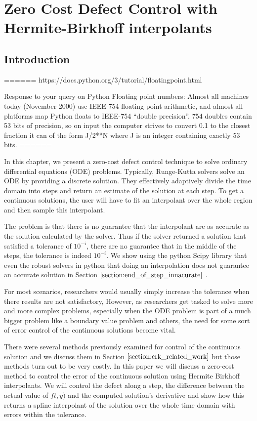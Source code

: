 \documentclass{article}
\begin{document}
\section{Zero Cost Defect Control with Hermite-Birkhoff interpolants}
\subsection{Introduction}

======
https://docs.python.org/3/tutorial/floatingpoint.html

Response to your query on Python Floating point numbers:
Almost all machines today (November 2000) use IEEE-754 floating point arithmetic, and almost all platforms map Python floats to IEEE-754 “double precision”. 754 doubles contain 53 bits of precision, so on input the computer strives to convert 0.1 to the closest fraction it can of the form J/2**N where J is an integer containing exactly 53 bits. 
======

In this chapter, we present a zero-cost defect control technique to solve ordinary differential equations (ODE) problems. Typically, Runge-Kutta solvers solve an ODE by providing a discrete solution. They effectively adaptively divide the time domain into steps and return an estimate of the solution at each step. To get a continuous solutions, the user will have to fit an interpolant over the whole region and then sample this interpolant. 

The problem is that there is no guarantee that the interpolant are as accurate as the solution calculated by the solver. Thus if the solver returned a solution that satisfied a tolerance of $10^{-i}$, there are no guarantee that in the middle of the steps, the tolerance is indeed $10^{-i}$. We show using the python Scipy library that even the robust solvers in python that doing an interpolation does not guarantee an accurate solution in Section $\ref{section:end_of_step_innacurate}$ . 

For most scenarios, researchers would usually simply increase the tolerance when there results are not satisfactory,  However, as researchers get tasked to solve more and more complex problems, especially when the ODE problem is part of a much bigger problem like a boundary value problem and others, the need for some sort of error control of the continuous solutions become vital.

There were several methods previously examined for control of the continuous solution and we discuss them in Section $\ref{section:crk_related_work}$ but those methods turn out to be very costly. In this paper we will discuss a zero-cost method to control the error of the continuous solution using Hermite Birkhoff interpolants. We will control the defect along a step, the difference between the actual value of $ft, y)$ and the computed solution's derivative and show how this returns a spline interpolant of the solution over the whole time domain with errors within the tolerance.
\end{document}
